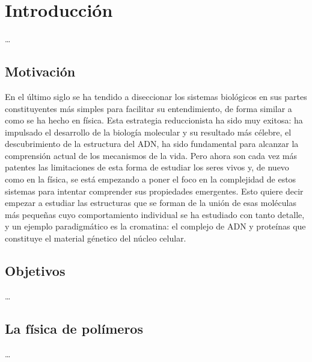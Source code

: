\chapter{Introducción}
\label{cap:introduction}

\dots

\section{Motivación}

En el último siglo se ha tendido a diseccionar los sistemas biológicos en sus partes constituyentes más simples para facilitar su entendimiento, de forma similar a como se ha hecho en física. Esta estrategia reduccionista ha sido muy exitosa: ha impulsado el desarrollo de la biología molecular y su resultado más célebre, el descubrimiento de la estructura del ADN, ha sido fundamental para alcanzar la comprensión actual de los mecanismos de la vida. Pero ahora son cada vez más patentes las limitaciones de esta forma de estudiar los seres vivos y, de nuevo como en la física, se está empezando a poner el foco en la complejidad de estos sistemas para intentar comprender sus propiedades emergentes. Esto quiere decir empezar a estudiar las estructuras que se forman de la unión de esas moléculas más pequeñas cuyo comportamiento individual se ha estudiado con tanto detalle, y un ejemplo paradigmático es la cromatina: el complejo de ADN y proteínas que constituye el material génetico del núcleo celular.

\section{Objetivos}

\dots

\section{La física de polímeros}

\dots
